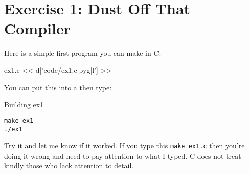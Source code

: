 \chapter{Exercise 1: Dust Off That Compiler}

Here is a simple first program you can make in C:

\begin{code}{ex1.c}
<< d['code/ex1.c|pyg|l'] >>
\end{code}

You can put this into a  then type:

\begin{code}{Building ex1}
\begin{Verbatim}
make ex1
./ex1
\end{Verbatim}
\end{code}

Try it and let me know if it worked.  If you type this \verb|make ex1.c| then
you're doing it wrong and need to pay attention to what I typed.  C does not
treat kindly those who lack attention to detail.

